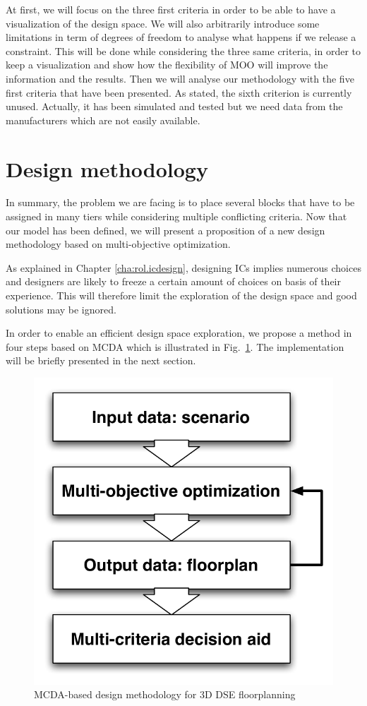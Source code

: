 At first, we will focus on the three first criteria in order to be able to have a visualization of the design space. We will also arbitrarily introduce some limitations in term of degrees of freedom to analyse what happens if we release a constraint. This will be done while considering the three same criteria, in order to keep a visualization and show how the flexibility of MOO will improve the information and the results. Then we will analyse our methodology with the five first criteria that have been presented. As stated, the sixth criterion is currently unused. Actually, it has been simulated and tested but we need data from the manufacturers which are not easily available.

\section{Design methodology}
In summary, the problem we are facing is to place several blocks that have to be assigned in many tiers while considering multiple conflicting criteria. Now that our model has been defined, we will present a proposition of a new design methodology based on multi-objective optimization.

As explained in Chapter \ref{cha:rol.icdesign}, designing ICs implies numerous choices and designers are likely to freeze a certain amount of choices on basis of their experience. This will therefore limit the exploration of the design space and good solutions may be ignored.

In order to enable an efficient design space exploration, we propose a method in four steps based on MCDA which is illustrated in Fig.~\ref{fig:mcdaflow}. The implementation will be briefly presented in the next section.

\begin{figure}[h!]
\begin{center}
\includegraphics[width=0.5\linewidth]{MCDA_Method.pdf}
\end{center}
\vspace{-0.5cm}
\caption{MCDA-based design methodology for 3D DSE floorplanning}
\label{fig:mcdaflow}
\end{figure}

